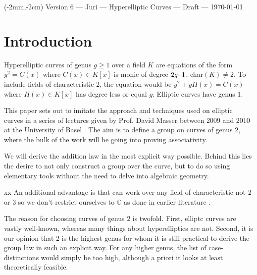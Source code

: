 \documentclass[english,11pt,a4paper]{article}
\begin{document}


\begin{textblock*}{360pt}(-2mm,-2cm)
  Version 6 \scriptsize \hfill --- Juri --- Hyperelliptic Curves --- Draft --- \today
  \normalsize
\end{textblock*}
\vspace{-1.5cm}


\setcounter{section}{-1}
\section{Introduction}

Hyperelliptic curves of genus $g \geq 1$ over a field $K$ are equations of the form $y^2 = C(x)$ where $C(x) \in K[x]$ is monic of degree $2g \hspace{-1mm} + \hspace{-1.2mm} 1$, \mbox{char$(K) \neq 2$}. To include fields of characteristic 2, the equation would be $y^2 + y H(x) = C(x)$ where $H(x) \in K[x]$ has degree less or equal $g$. Elliptic curves have genus 1.

This paper sets out to imitate the approach and techniques used on elliptic curves in a series of lectures given by Prof. David Masser between 2009 and 2010 at the University of Basel \cite{masser}. The aim is to define a group on curves of genus 2, where the bulk of the work will be going into proving associativity.

We will derive the addition law in the most explicit way possible. Behind this lies the desire to not only construct a group over the curve, but to do so using elementary tools without the need to delve into algebraic geometry.



xx An additional advantage is that can work over any field of characteristic not 2 or 3 so we don't restrict ourselves to $\mathds{C}$ as done in earlier literature \cite{mumf}.

The reason for choosing curves of genus $2$ is twofold. First, elliptc curves are vastly well-known, whereas many things about hyperelliptics are not. Second, it is our opinion that $2$ is the highest genus for whom it is still practical to derive the group law in such an explicit way. For any higher genus, the list of case-distinctions would simply be too high, although a priori it looks at least theoretically feasible. %
\end{document}
